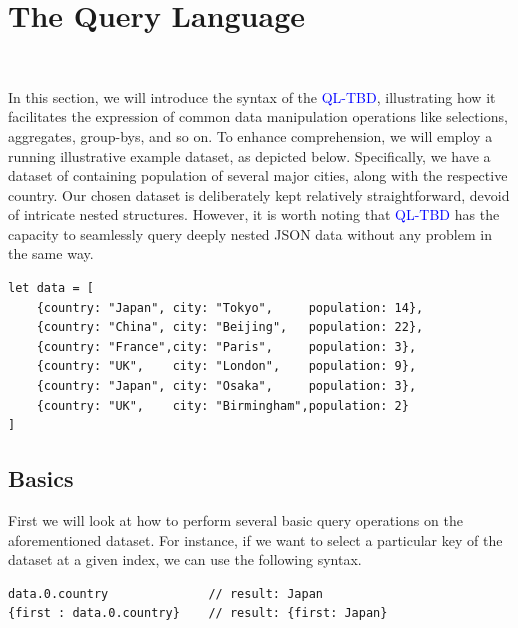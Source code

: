 \documentclass[runningheads]{llncs}
\newcommand{\lang}{\textcolor{blue}{QL-TBD}}
\begin{document}



\section{The Query Language}~\label{sec:query_language}

In this section, we will introduce the syntax of the \lang{}, illustrating how it facilitates
the expression of common data manipulation operations like selections, aggregates,
group-bys, and so on.
To enhance comprehension, we will employ a running illustrative example dataset, as
depicted below.
Specifically, we have a dataset of containing population of several major cities,
along with the respective country.
Our chosen dataset is deliberately kept relatively straightforward, devoid of
intricate nested structures.
However, it is worth noting that \lang{} has the capacity to seamlessly query
deeply nested JSON data without any problem in the same way.


\begin{lstlisting}[style=JavaScript]
let data = [
    {country: "Japan", city: "Tokyo",     population: 14},
    {country: "China", city: "Beijing",   population: 22},
    {country: "France",city: "Paris",     population: 3},
    {country: "UK",    city: "London",    population: 9},
    {country: "Japan", city: "Osaka",     population: 3},
    {country: "UK",    city: "Birmingham",population: 2}
]
\end{lstlisting}


\subsection{Basics}
First we will look at how to perform several basic query operations on the
aforementioned dataset.
For instance, if we want to select a particular key of the dataset at a given
index, we can use the following syntax.

\begin{lstlisting}[style=JavaScript]
data.0.country              // result: Japan
{first : data.0.country}    // result: {first: Japan}
\end{lstlisting}
\end{document}
